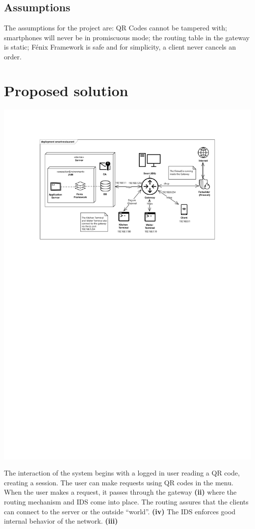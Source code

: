 \documentclass[12pt,paper=a4]{article}
\begin{document}
\subsection{Assumptions}
The assumptions for the project are: QR Codes cannot be tampered with; smartphones will never be in promiscuous mode; the routing table in the gateway is static; Fénix Framework is safe and for simplicity, a client never cancels an order.
\pagebreak
\section{Proposed solution}

\includegraphics[trim=3.8cm 18cm 0 2cm]{Diagrama.pdf}

The interaction of the system begins with a logged in user reading a QR code, creating a session. The user can make requests using QR codes in the menu. When the user makes a request, it passes through the gateway \textbf{(ii)} where the routing mechanism and IDS come into place. The routing assures that the clients can connect to the server or the outside “world”. \textbf{(iv)} The IDS enforces good internal behavior of the network. \textbf{(iii)}
\end{document}
